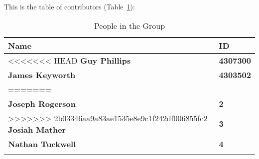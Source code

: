 This is the table of contributors (Table~\ref{authors}):
\begin{table}%
\centering
\caption{People in the Group}
\label{authors}
\begin{tabular}{|l|l|}
\hline
\textbf{Name} & \textbf{ID} \\
\hline
<<<<<<< HEAD
\textbf{Guy Phillips} & \textbf{4307300} \\
\hline
\textbf{James Keyworth} & \textbf{4303502} \\
=======
&\\
\hline
\textbf{Joseph Rogerson} & \textbf{2} 
\\
>>>>>>> 2b03346aa9a83ae1535e8e9c1f242df006855fc2
\hline
\textbf{Josiah Mather} & \textbf{3} \\
\hline
\textbf{Nathan Tuckwell} & \textbf{4} \\
\hline
& \\
\hline
\end{tabular}
\end{table}